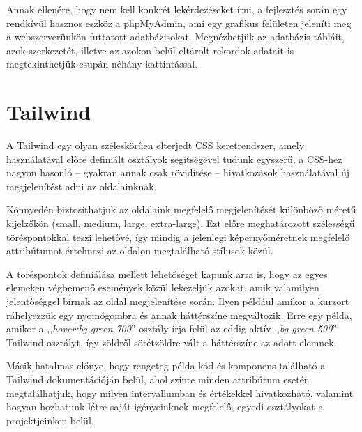 \documentclass[
]{thesis-ekf}
\theoremstyle{definition}
\theoremstyle{remark}
\begin{document}
            Annak ellenére, hogy nem kell konkrét lekérdezéseket írni, a fejlesztés során egy rendkívül hasznos eszköz a phpMyAdmin, ami egy grafikus felületen jeleníti meg a webszerverünkön futtatott adatbázisokat. Megnézhetjük az adatbázis tábláit, azok szerkezetét, illetve az azokon belül eltárolt rekordok adatait is megtekinthetjük csupán néhány kattintással.

	   \section{Tailwind}
            A Tailwind\cite{TailwindCSS} egy olyan széleskörűen elterjedt CSS keretrendszer, amely használatával előre definiált osztályok segítségével tudunk egyszerű, a CSS-hez nagyon hasonló -- gyakran annak csak rövidítése -- hivatkozások használatával új megjelenítést adni az oldalainknak.
            
            Könnyedén biztosíthatjuk az oldalaink megfelelő megjelenítését különböző méretű kijelzőkön (small, medium, large, extra-large). Ezt előre meghatározott szélességű töréspontokkal teszi lehetővé, így mindig a jelenlegi képernyőméretnek megfelelő attribútumot értelmezi az oldalon megtalálható stílusok közül.

            A töréspontok definiálása mellett lehetőséget kapunk arra is, hogy az egyes elemeken végbemenő események közül lekezeljük azokat, amik valamilyen jelentőséggel bírnak az oldal megjelenítése során. Ilyen például amikor a kurzort ráhelyezzük egy nyomógombra és annak háttérszíne megváltozik. Erre egy példa, amikor a ,,\emph{hover:bg-green-700}'' osztály írja felül az eddig aktív ,,\emph{bg-green-500}'' Tailwind osztályt, így zöldről sötétzöldre vált a háttérszíne az adott elemnek.

            Másik hatalmas előnye, hogy rengeteg példa kód és komponens található a Tailwind dokumentációján belül, ahol szinte minden attribútum esetén megtalálhatjuk, hogy milyen intervallumban és értékekkel hivatkozható, valamint hogyan hozhatunk létre saját igényeinknek megfelelő, egyedi osztályokat a projektjeinken belül.
            
\end{document}
